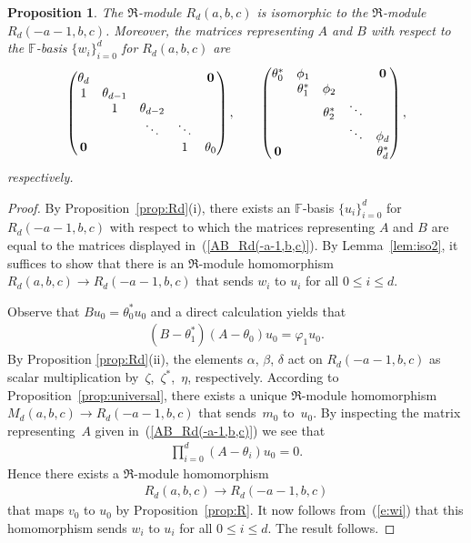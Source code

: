 \documentclass[pdftex]{sigma}
\def\F{\mathbb F}
\numberwithin{equation}{section}
\newtheorem{Proposition}[Theorem]{Proposition}
 { \theoremstyle{definition}
\newtheorem{Definition}[Theorem]{Definition}
\newtheorem{Example}[Theorem]{Example} }
\begin{document}
\begin{Proposition}\label{prop:iso2}The $\Re$-module $R_d(a,b,c)$ is isomorphic to the $\Re$-module $R_d(-a-1,b,c)$. Moreover, the matrices representing $A$ and $B$ with respect to the $\F$-basis $\{w_i\}_{i=0}^d$ for $R_d(a,b,c)$ are
\begin{gather}\label{AB_Rd(-a-1,b,c)}
\begin{pmatrix}
\theta_d & & & &{\bf 0}
\\
1 &\theta_{d-1}
\\
&1 &\theta_{d-2}
 \\
& &\ddots &\ddots
 \\
{\bf 0} & & &1 &\theta_0
\end{pmatrix},
\qquad
\begin{pmatrix}
\theta_0^* &\phi_1 & & &{\bf 0}
\\
 &\theta_1^* &\phi_2
\\
 & &\theta_2^* &\ddots
 \\
 & & &\ddots &\phi_d
 \\
{\bf 0} & & & &\theta_d^*
\end{pmatrix},
\end{gather}
respectively.
\end{Proposition}
\begin{proof}By Proposition~\ref{prop:Rd}(i), there exists an $\F$-basis $\{u_i\}_{i=0}^d$ for $R_d(-a-1,b,c)$ with respect to which the matrices representing $A$ and $B$ are equal to the matrices displayed in~(\ref{AB_Rd(-a-1,b,c)}). By Lemma~\ref{lem:iso2}, it suffices to show that there is an $\Re$-module homomorphism $R_d(a,b,c)\to R_d(-a-1,\allowbreak b,c)$ that sends $w_i$ to $u_i$ for all $0\leq i\leq d$.

Observe that $B u_0=\theta_0^* u_0$ and a direct calculation yields that
\begin{gather*}
(B-\theta_1^*)(A-\theta_0) u_0=\varphi_1 u_0.
\end{gather*}
By Proposition \ref{prop:Rd}(ii), the elements $\alpha$, $\beta$, $\delta$ act on $R_d(-a-1,b,c)$ as scalar multiplication by~$\zeta$,~$\zeta^*$,~$\eta$, respectively. According to Proposition~\ref{prop:universal}, there exists a unique $\Re$-module homomorphism $M_d(a,b,c)\to R_d(-a-1,b,c)$ that sends~$m_0$ to~$u_0$. By inspecting the matrix representing~$A$ given in~(\ref{AB_Rd(-a-1,b,c)}) we see that
\begin{gather*}
\prod_{i=0}^d (A-\theta_i)u_0=0.
\end{gather*}
Hence there exists a $\Re$-module homomorphism
\begin{gather*}%
R_d(a,b,c)\to R_d(-a-1,b,c)
\end{gather*}
that maps $v_0$ to $u_0$ by Proposition~\ref{prop:R}. It now follows from~(\ref{e:wi}) that this homomorphism sends $w_i$ to $u_i$ for all $0\leq i\leq d$. The result follows.
\end{proof}
\end{document}
